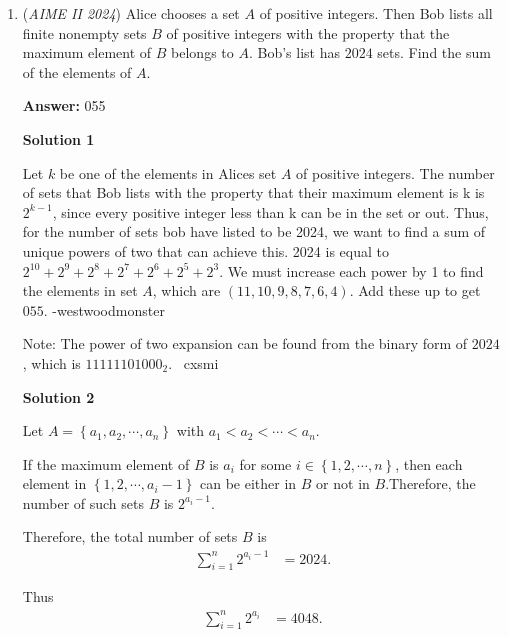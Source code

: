 \begin{enumerate}
 


 \textbf{Note} This problem is really similar to 2021 Spring AMC 10A Problem 21. This really emphasizes the importance of studying up on past tests before taking the AMC.

 -DoHumanitariansEatHumans

 


	\item (\textit{AIME II 2024}) Alice chooses a set $A$ of positive integers. Then Bob lists all finite nonempty sets $B$ of positive integers with the property that the maximum element of $B$ belongs to $A$. Bob's list has $2024$ sets. Find the sum of the elements of $A$.


 
 \textbf{Answer: }055



\textbf{Solution 1}

Let $k$ be one of the elements in Alices set $A$ of positive integers. The number of sets that Bob lists with the property that their maximum element is k is $2^{k-1}$, since every positive integer less than k can be in the set or out. Thus, for the number of sets bob have listed to be 2024, we want to find a sum of unique powers of two that can achieve this. 2024 is equal to $2^{10}+2^9+2^8+2^7+2^6+2^5+2^3$. We must increase each power by 1 to find the elements in set $A$, which are $(11,10,9,8,7,6,4)$. Add these up to get $\boxed{055}$. -westwoodmonster

 Note: The power of two expansion can be found from the binary form of $2024$, which is $11111101000_2$. ~cxsmi

 



\textbf{Solution 2}

Let $A = \left\{ a_1, a_2, \cdots, a_n \right\}$ with $a_1 < a_2 < \cdots < a_n$.

 If the maximum element of $B$ is $a_i$ for some $i \in \left\{ 1, 2, \cdots , n \right\}$, then each element in $\left\{ 1, 2, \cdots, a_i- 1 \right\}$ can be either in $B$ or not in $B$.Therefore, the number of such sets $B$ is $2^{a_i - 1}$.

 Therefore, the total number of sets $B$ is\begin{align*}\sum_{i=1}^n 2^{a_i - 1} & = 2024 .\end{align*}


 Thus\begin{align*}\sum_{i=1}^n 2^{a_i} & = 4048 .\end{align*}



\end{enumerate}

